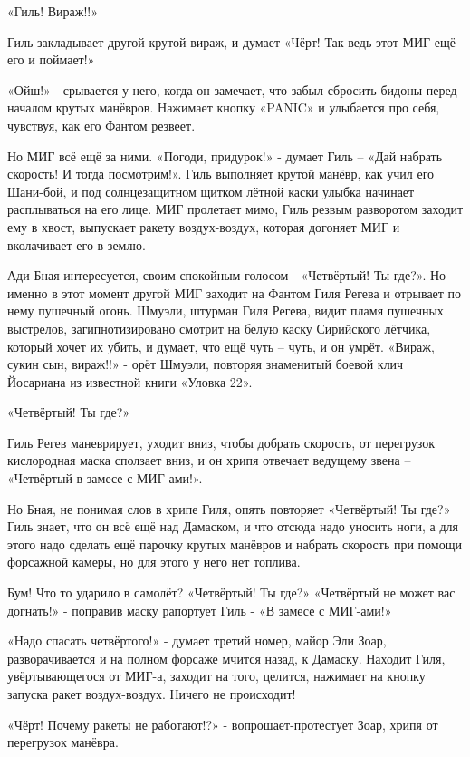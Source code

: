\begin{textcitation}
	«Гиль! Вираж!!» 
	
	Гиль закладывает другой крутой вираж, и думает «Чёрт! Так ведь этот МИГ ещё его и поймает!» 
	
	«Ойш!» - срывается у него, когда он замечает, что забыл сбросить бидоны перед началом крутых манёвров. Нажимает кнопку «PANIC» и улыбается про себя, чувствуя, как его Фантом резвеет. 
	
	Но МИГ всё ещё за ними. «Погоди, придурок!» - думает Гиль – «Дай набрать скорость! И тогда посмотрим!». Гиль выполняет крутой манёвр, как учил его Шани-бой, и под солнцезащитном щитком лётной каски улыбка начинает расплываться на его лице. МИГ пролетает мимо, Гиль резвым разворотом заходит ему в хвост, выпускает ракету воздух-воздух, которая догоняет МИГ и вколачивает его в землю. 
	
	Ади Бная интересуется, своим спокойным голосом - «Четвёртый! Ты где?».
	Но именно в этот момент другой МИГ заходит на Фантом Гиля Регева и отрывает по нему пушечный огонь. Шмуэли, штурман Гиля Регева, видит пламя пушечных выстрелов, загипнотизировано смотрит на белую каску Сирийского лётчика, который хочет их убить, и думает, что ещё чуть – чуть, и он умрёт.
	«Вираж, сукин сын, вираж!!» - орёт Шмуэли, повторяя знаменитый боевой клич Йосариана из известной книги «Уловка 22». 
	
	«Четвёртый! Ты где?» 
	
	Гиль Регев маневрирует, уходит вниз, чтобы добрать скорость, от перегрузок кислородная маска сползает вниз, и он хрипя отвечает ведущему звена – «Четвёртый в замесе с МИГ-ами!». 
	
	Но Бная, не понимая слов в хрипе Гиля, опять повторяет «Четвёртый! Ты где?»
	Гиль знает, что он всё ещё над Дамаском, и что отсюда надо уносить ноги, а для этого надо сделать ещё парочку крутых манёвров и набрать скорость при помощи форсажной камеры, но для этого у него нет топлива.
	
	Бум! Что то ударило в самолёт?
	«Четвёртый! Ты где?»
	«Четвёртый не может вас догнать!» - поправив маску рапортует Гиль - «В замесе с МИГ-ами!» 
	
	«Надо спасать четвёртого!» - думает третий номер, майор Эли Зоар, разворачивается и на полном форсаже мчится назад, к Дамаску. Находит Гиля, увёртывающегося от МИГ-а, заходит на того, целится, нажимает на кнопку запуска ракет воздух-воздух. Ничего не происходит! 
	
	«Чёрт! Почему ракеты не работают!?» - вопрошает-протестует Зоар, хрипя от перегрузок манёвра. 
	

\end{textcitation}
